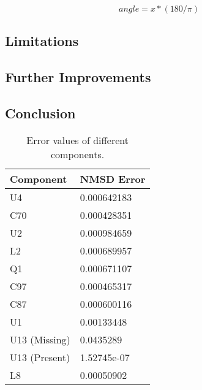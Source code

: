 \documentclass[conference]{IEEEtran}
\begin{document}
\begin{equation}
angle = x*(180/\pi )
\end{equation}


\subsection{Limitations}\label{sec:t2_lim}

\subsection{Further Improvements}

\subsection{Conclusion}

\begin{table}[]
\caption{Error values of different components.}
\label{tab:t3error}
\begin{tabular}{|l|l|}
\hline
\textbf{Component} & \textbf{NMSD Error} \\ \hline
U4                 & 0.000642183         \\ \hline
C70                & 0.000428351         \\ \hline
U2                 & 0.000984659         \\ \hline
L2                 & 0.000689957         \\ \hline
Q1                 & 0.000671107         \\ \hline
C97                & 0.000465317         \\ \hline
C87                & 0.000600116         \\ \hline
U1                 & 0.00133448          \\ \hline
U13 (Missing)      & 0.0435289           \\ \hline
U13 (Present)      & 1.52745e-07         \\ \hline
L8                 & 0.00050902          \\ \hline
\end{tabular}
\end{table}
\end{document}
